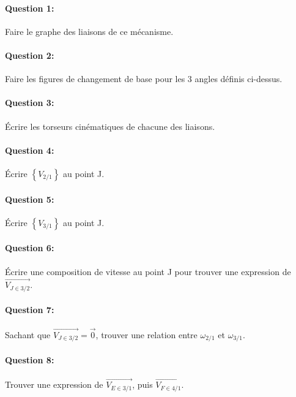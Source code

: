 \paragraph{Question 1:} Faire le graphe des liaisons de ce mécanisme.

\paragraph{Question 2:} Faire les figures de changement de base pour les 3 angles définis ci-dessus.

\paragraph{Question 3:} Écrire les torseurs cinématiques de chacune des liaisons.

\paragraph{Question 4:} Écrire $\left\{V_{2/1}\right\}$ au point J.

\paragraph{Question 5:} Écrire $\left\{V_{3/1}\right\}$ au point J.

\paragraph{Question 6:} Écrire une composition de vitesse au point J pour trouver une expression de 
$\overrightarrow{V_{J\in 3/2}}$.

\paragraph{Question 7:} Sachant que $\overrightarrow{V_{J\in 3/2}}=\overrightarrow{0}$, trouver une relation entre $\omega_{2/1}$ et $\omega_{3/1}$.

\paragraph{Question 8:} Trouver une expression de $\overrightarrow{V_{E\in 3/1}}$, puis $\overrightarrow{V_{F\in 4/1}}$.




